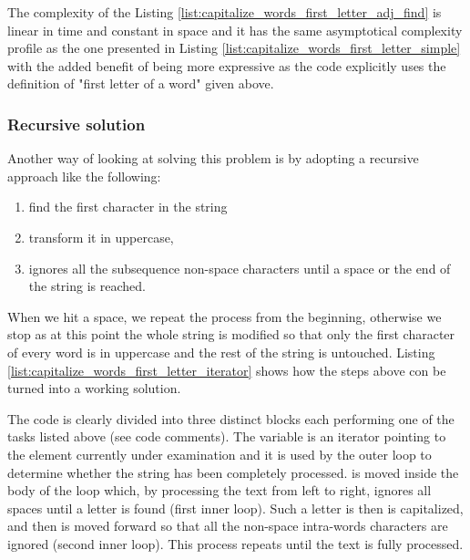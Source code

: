 

The complexity of the Listing \ref{list:capitalize_words_first_letter_adj_find}  is linear in time and constant in space and it has the same asymptotical complexity profile as the one presented in Listing \ref{list:capitalize_words_first_letter_simple} with the added benefit of being more expressive as the code explicitly uses the definition of "first letter of a word" given above.

\subsubsection{Recursive solution}

Another way of looking at solving this problem is by adopting a recursive approach like the following: 
\begin{enumerate}
	\item find the first character in the string 
	\item transform it in uppercase,
	\item ignores all the subsequence non-space characters until a space or the end of the string is reached.
\end{enumerate}
When we hit a space, we repeat the process from the beginning, otherwise we stop as at this point the whole string is modified so that only the first character of every word is in uppercase and the rest of the string is untouched.
Listing \ref{list:capitalize_words_first_letter_iterator} shows how the steps above con be turned into a working solution. 



The code is clearly divided into three distinct blocks each performing one of the tasks listed above (see code comments).
The variable  is an iterator pointing to the  element currently under examination and it is used by the outer loop to determine whether the string has been completely processed.
 is moved inside the body of the loop which, by processing the text from left to right, ignores all spaces until a letter is found (first inner loop). Such a letter is then is capitalized, and then  is moved forward so that all the non-space intra-words characters are ignored (second inner loop). This process repeats until the text is fully processed. 

